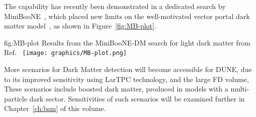 The capability has recently been demonstrated in a dedicated search by MiniBooNE~\cite{Aguilar-Arevalo:2018wea,Aguilar-Arevalo:2017mqx}, which placed new limits on the well-motivated vector portal dark matter model~\cite{Pospelov:2007mp}, as shown in Figure~\ref{fig:MB-plot}.


\begin{dunefigure}{fig:MB-plot}
{Results from the MiniBooNE-DM search for light dark matter from Ref.~\cite{Aguilar-Arevalo:2018wea}
}
\texttt{[image: graphics/MB-plot.png]}
\end{dunefigure}

More scenarios for Dark Matter detection will become accessible for DUNE, due to its improved sensitivity
using LarTPC technology, and the large FD volume, These scenarios include boosted dark matter, 
produced in models with 
a multi-particle dark sector. Sensitivities of such scenarios will be 
examined further in Chapter~\ref{ch:bsm} of this volume.


